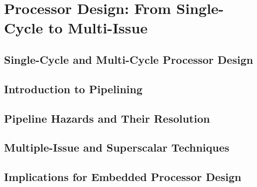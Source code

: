 \chapter{Processor Design: From Single-Cycle to Multi-Issue}
\label{ch:processor-design}


\section{Single-Cycle and Multi-Cycle Processor Design}

\section{Introduction to Pipelining}

\section{Pipeline Hazards and Their Resolution}

\section{Multiple-Issue and Superscalar Techniques}

\section{Implications for Embedded Processor Design}
